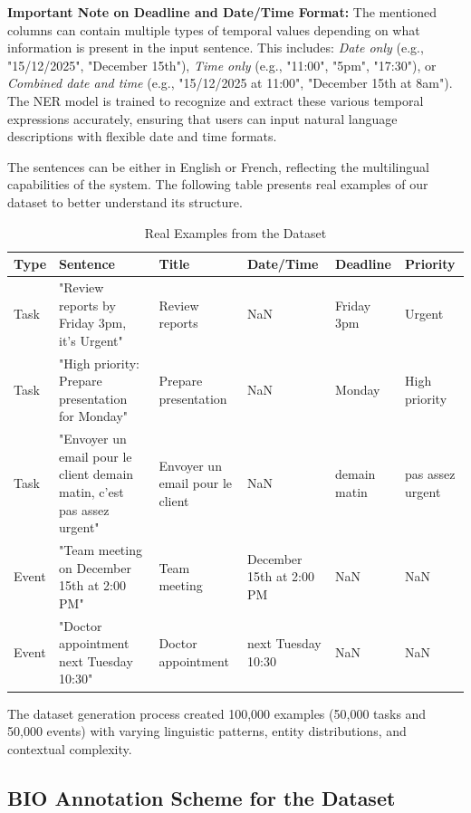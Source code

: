 \documentclass[12pt,a4paper]{article}
\begin{document}
\textbf{Important Note on Deadline and Date/Time Format:} The mentioned columns can contain multiple types of temporal values depending on what information is present in the input sentence. This includes: \textit{Date only} (e.g., "15/12/2025", "December 15th"), \textit{Time only} (e.g., "11:00", "5pm", "17:30"), or \textit{Combined date and time} (e.g., "15/12/2025 at 11:00", "December 15th at 8am"). The NER model is trained to recognize and extract these various temporal expressions accurately, ensuring that users can input natural language descriptions with flexible date and time formats.

The sentences can be either in English or French, reflecting the multilingual capabilities of the system. The following table presents real examples of our dataset to better understand its structure. 


\begin{table}[H]
\centering
\small
\begin{tabularx}{\textwidth}{|l|X|p{3cm}|p{2cm}|p{2cm}|p{2cm}|}
\hline
\textbf{Type} & \textbf{Sentence} & \textbf{Title} & \textbf{Date/Time} & \textbf{Deadline} & \textbf{Priority} \\
\hline
Task & "Review reports by Friday 3pm, it's Urgent" & Review reports & NaN & Friday 3pm & Urgent \\
\hline
Task & "High priority: Prepare presentation for Monday" & Prepare presentation & NaN & Monday & High priority \\
\hline
Task & "Envoyer un email pour le client demain matin, c'est pas assez urgent" & Envoyer un email pour le client & NaN &  demain matin & pas assez urgent \\
\hline
Event & "Team meeting on December 15th at 2:00 PM" & Team meeting & December 15th at 2:00 PM & NaN & NaN \\
\hline
Event & "Doctor appointment next Tuesday 10:30" & Doctor appointment & next Tuesday 10:30 & NaN & NaN \\
\hline
\end{tabularx}
\caption{Real Examples from the Dataset}
\end{table}


The dataset generation process created 100,000 examples (50,000 tasks and 50,000 events) with varying linguistic patterns, entity distributions, and contextual complexity.


\subsection{BIO Annotation Scheme for the Dataset}
\end{document}
